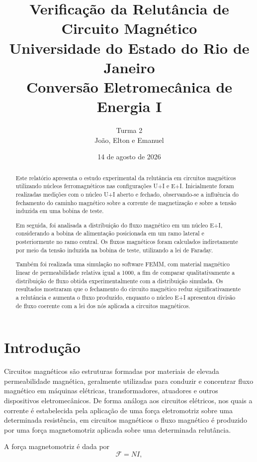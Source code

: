 \documentclass[11pt,a4paper]{article}
\title{ 
    \textbf{Verificação da Relutância de Circuito Magnético}\\ 
    \large Universidade do Estado do Rio de Janeiro\\ 
    \large Conversão Eletromecânica de Energia I 
}
\author{ 
    Turma 2\\ 
    João, Elton e Emanuel 
}
\date{14 de agosto de 2026}
\begin{document}
\maketitle 
\thispagestyle{fancy}

\begin{abstract} Este relatório apresenta o estudo experimental da relutância em circuitos magnéticos utilizando núcleos ferromagnéticos nas configurações U+I e E+I. Inicialmente foram realizadas medições com o núcleo U+I aberto e fechado, observando-se a influência do fechamento do caminho magnético sobre a corrente de magnetização e sobre a tensão induzida em uma bobina de teste.

Em seguida, foi analisada a distribuição do fluxo magnético em um núcleo E+I, considerando a bobina de alimentação posicionada em um ramo lateral e posteriormente no ramo central. Os fluxos magnéticos foram calculados indiretamente por meio da tensão induzida na bobina de teste, utilizando a lei de Faraday.

Também foi realizada uma simulação no software FEMM, com material magnético linear de permeabilidade relativa igual a 1000, a fim de comparar qualitativamente a distribuição de fluxo obtida experimentalmente com a distribuição simulada. Os resultados mostraram que o fechamento do circuito magnético reduz significativamente a relutância e aumenta o fluxo produzido, enquanto o núcleo E+I apresentou divisão de fluxo coerente com a lei dos nós aplicada a circuitos magnéticos. \end{abstract}

\section{Introdução} Circuitos magnéticos são estruturas formadas por materiais de elevada permeabilidade magnética, geralmente utilizadas para conduzir e concentrar fluxo magnético em máquinas elétricas, transformadores, atuadores e outros dispositivos eletromecânicos. De forma análoga aos circuitos elétricos, nos quais a corrente é estabelecida pela aplicação de uma força eletromotriz sobre uma determinada resistência, em circuitos magnéticos o fluxo magnético é produzido por uma força magnetomotriz aplicada sobre uma determinada relutância.

A força magnetomotriz é dada por 
\begin{equation} 
    \mathcal{F} = N I , 
    \label{eq:fmm} 
\end{equation}
\end{document}
